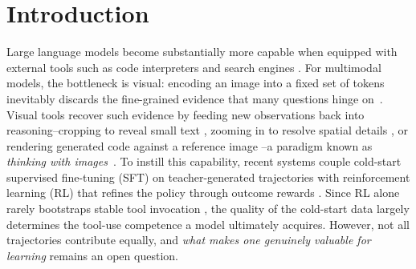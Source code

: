 

\section{Introduction}
\label{sec:introduction}

Large language models become substantially more capable when equipped with external tools such as code interpreters \citep{xue2025simpletir,feng2025retool} and search engines \citep{jin2025searchr1,Search-o1,Li2025WebThinker}. 
For multimodal models, the bottleneck is visual: encoding an image into a fixed set of tokens inevitably discards the fine-grained evidence that many questions hinge on~\citep{su2025thinkingsurvey}.
Visual tools recover such evidence by feeding new observations back into reasoning--cropping to reveal small text \citep{chartagent}, zooming in to resolve spatial details \citep{zheng2026deepeyes}, or rendering generated code against a reference image \citep{ui2coden2026}--a paradigm known as \textit{thinking with images}~\citep{openai2025o3}. 
To instill this capability, recent systems couple cold-start supervised fine-tuning (SFT) on teacher-generated trajectories with reinforcement learning (RL) that refines the policy through outcome rewards \citep{lai2026minio3,hou2025codev,guo2025codevision}.
Since RL alone rarely bootstraps stable tool invocation \citep{hong2026deepeyesv2,zhang2026thyme}, the quality of the cold-start data largely determines the tool-use competence a model ultimately acquires.
However, not all trajectories contribute equally, and \textit{what makes one genuinely valuable for learning} remains an open question.


